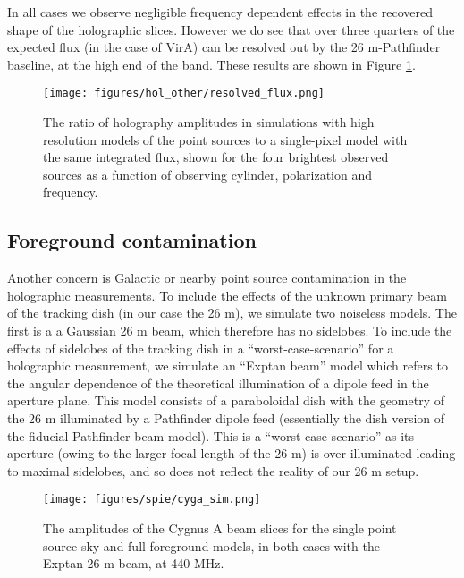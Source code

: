 In all cases we observe negligible frequency dependent effects in the recovered shape of the holographic slices. However we do see that over three quarters of the expected flux (in the case of VirA) can be resolved out by the 26 m-Pathfinder baseline, at the high end of the band. These results are shown in Figure \ref{resolved_flux}.

\begin{figure}[h!]
\begin{center}
\texttt{[image: figures/hol\_other/resolved\_flux.png]}
\caption{The ratio of holography amplitudes in simulations with high resolution models of the point sources to a single-pixel model with the same integrated flux, shown for the four brightest observed sources as a function of observing cylinder, polarization and frequency.}
\label{resolved_flux}
\end{center}
\end{figure} 

\subsection{Foreground contamination}
Another concern is Galactic or nearby point source contamination in the holographic measurements. To include the effects of the unknown primary beam of the tracking dish (in our case the 26 m), we simulate two noiseless models. The first is a a Gaussian 26 m beam, which therefore has no sidelobes. To include the effects of sidelobes of the tracking dish in a ``worst-case-scenario'' for a holographic measurement, we simulate an ``Exptan beam'' model which refers to the angular dependence of the theoretical illumination of a dipole feed in the aperture plane\citep{mmodes2}. This model consists of a paraboloidal dish with the geometry of the 26 m illuminated by a Pathfinder dipole feed (essentially the dish version of the fiducial Pathfinder beam model). This is a ``worst-case scenario'' as its aperture (owing to the larger focal length of the 26 m) is over-illuminated leading to maximal sidelobes, and so does not reflect the reality of our 26 m setup.

\begin{figure}[h!] %
	\centering	
	\texttt{[image: figures/spie/cyga\_sim.png]}%
	\caption{The amplitudes of the Cygnus A beam slices for the single point source sky and full foreground models, in both cases with the Exptan 26 m beam, at 440 MHz. }
	\label{cygasim}
\end{figure}

